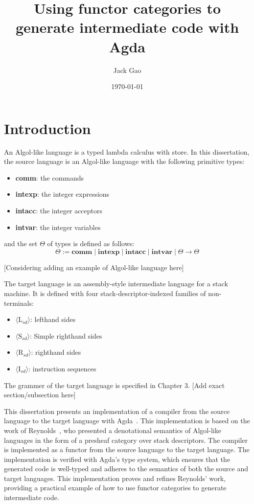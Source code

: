 \documentclass[12pt,twoside,a4paper]{report}
\theoremstyle{definition}
\theoremstyle{definition}
\begin{document}
\dominitoc

\title{Using functor categories to generate intermediate code with Agda}
\author{Jack Gao}
\date{\today}
\maketitle

\tableofcontents
\newpage

\chapter{Introduction}
    \minitoc
    An Algol-like language is a typed lambda calculus with store. In this dissertation, the source language is an Algol-like language with the following primitive types:
    \begin{itemize}
        \item 
            \textbf{comm}: the commands
        \item 
            \textbf{intexp}: the integer expressions
        \item 
            \textbf{intacc}: the integer acceptors
        \item 
            \textbf{intvar}: the integer variables
    \end{itemize}
    and the set $\Theta$ of types is defined as follows:
    \[ \Theta := \textbf{comm} \mid \textbf{intexp} \mid \textbf{intacc} \mid \textbf{intvar} \mid \Theta \to \Theta \]

    [Considering adding an example of Algol-like language here]

    The target language is an assembly-style intermediate language for a stack machine. It is defined with four stack-descriptor-indexed families of non-terminals: 
    \begin{itemize}
        \item 
            $\langle\text{L}_{sd}\rangle$: lefthand sides
        \item 
            $\langle\text{S}_{sd}\rangle$: Simple righthand sides
        \item
            $\langle\text{R}_{sd}\rangle$: righthand sides
        \item
            $\langle\text{I}_{sd}\rangle$: instruction sequences
    \end{itemize}

    The grammer of the target language is specified in Chapter 3. [Add exact section/subsection here]

    This dissertation presents an implementation of a compiler from the source language to the target language with Agda~\cite{Agda}. This implementation is based on the work of Reynolds~\cite{Reynolds}, who presented a denotational semantics of Algol-like languages in the form of a presheaf category over stack descriptors. The compiler is implemented as a functor from the source language to the target language. The implementation is verified with Agda's type system, which ensures that the generated code is well-typed and adheres to the semantics of both the source and target languages. This implementation proves and refines Reynolds' work, providing a practical example of how to use functor categories to generate intermediate code.
\end{document}
